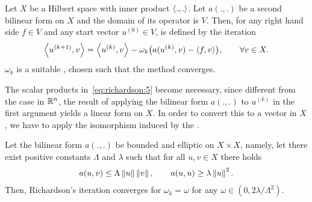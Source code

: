 \begin{definition}
  Let $X$ be a Hilbert space with inner product $\scal(.,.)$. Let
  $a(.,.)$ be a second bilinear form on $X$ and the domain of its
  operator is $V$. Then, for any right hand
  side $f\in V$ and any start vector $u^{(0)}\in V$,
   is defined by the iteration
  \begin{gather}
    \label{eq:richardson:5}
    \scal(u^{(k+1)},v) = \scal(u^{(k)},v)
    - \omega_k \bigl(a(u^{(k)},v) - \scal(f,v)\bigr), \qquad \forall v\in X.
  \end{gather}
  $\omega_k$ is a suitable , chosen
  such that the method converges.
\end{definition}

\begin{note}
  The scalar products in~\eqref{eq:richardson:5} become necessary,
  since different from the case in $\mathbb R^n$, the result of applying the
  bilinear form $a(.,.)$ to $u^{(k)}$ in the first argument yields a
  linear form on $X$. In order to convert this to a vector in $X$, we
  have to apply the isomorphism induced by the .
\end{note}

\begin{theorem}
  \label{theorem:richardson:2}
  Let the bilinear form $a(.,.)$ be bounded and elliptic on $X\times
  X$, namely, let there exist positive constants $\Lambda$ and $\lambda$ such
  that for all $u,v\in X$ there holds
  \begin{gather}
    \label{eq:richardson:6}
    a(u,v) \le \Lambda \left\|u\right\| \left\|v\right\|,
    \qquad
    a(u,u) \ge \lambda \left\|u\right\|^2.
  \end{gather}
  Then, Richardson's iteration converges for
  $\omega_k = \omega$ for any $\omega \in (0, 2\lambda/\Lambda^2)$.
\end{theorem}


